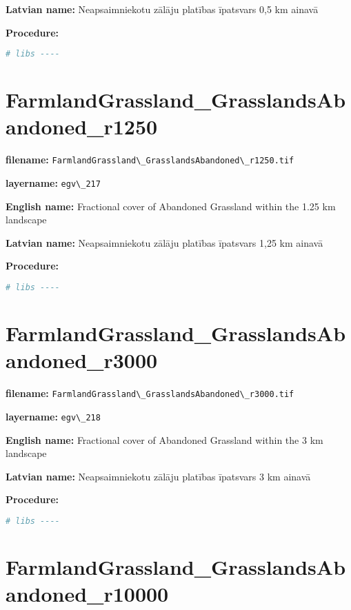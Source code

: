 \documentclass[
]{book}
\newcommand{\passthrough}[1]{#1}
\begin{document}
\textbf{Latvian name:} Neapsaimniekotu zālāju platības īpatsvars 0,5 km ainavā

\textbf{Procedure:}

\begin{lstlisting}[language=R]
# libs ----
\end{lstlisting}

\section{FarmlandGrassland\_GrasslandsAbandoned\_r1250}\label{ch06.217}

\textbf{filename:} \passthrough{\lstinline!FarmlandGrassland\_GrasslandsAbandoned\_r1250.tif!}

\textbf{layername:} \passthrough{\lstinline!egv\_217!}

\textbf{English name:} Fractional cover of Abandoned Grassland within the 1.25 km landscape

\textbf{Latvian name:} Neapsaimniekotu zālāju platības īpatsvars 1,25 km ainavā

\textbf{Procedure:}

\begin{lstlisting}[language=R]
# libs ----
\end{lstlisting}

\section{FarmlandGrassland\_GrasslandsAbandoned\_r3000}\label{ch06.218}

\textbf{filename:} \passthrough{\lstinline!FarmlandGrassland\_GrasslandsAbandoned\_r3000.tif!}

\textbf{layername:} \passthrough{\lstinline!egv\_218!}

\textbf{English name:} Fractional cover of Abandoned Grassland within the 3 km landscape

\textbf{Latvian name:} Neapsaimniekotu zālāju platības īpatsvars 3 km ainavā

\textbf{Procedure:}

\begin{lstlisting}[language=R]
# libs ----
\end{lstlisting}

\section{FarmlandGrassland\_GrasslandsAbandoned\_r10000}\label{ch06.219}
\end{document}
